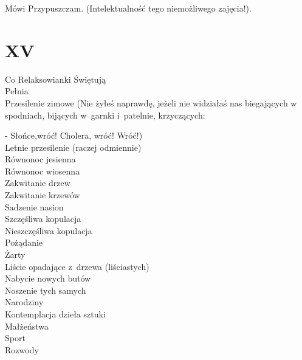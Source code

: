 \documentclass[oneside,polish,12pt,sfheadings]{mwbk}
\begin{document}
Mówi Przypuszczam. (Intelektualność tego niemożliwego zajęcia!).

\chapter{XV}

Co Relaksowianki Świętują\\


Pełnia\\


Przesilenie zimowe (Nie żyłeś naprawdę, jeżeli nie widziałaś nas biegających
w spodniach, bijących w~garnki i~patelnie, krzyczących: 

- Słońce,wróć! Cholera, wróć! Wróć!)\\

Letnie przesilenie (raczej odmiennie)\\

Równonoc jesienna\\

Równonoc wiosenna\\

Zakwitanie drzew\\

Zakwitanie krzewów\\

Sadzenie nasion\\

Szczęśliwa kopulacja\\

Nieszczęśliwa kopulacja\\

Pożądanie\\

Żarty\\

Liście opadające z~drzewa (liściastych)\\

Nabycie nowych butów\\

Noszenie tych samych\\

Narodziny\\

Kontemplacja dzieła sztuki\\

Małżeństwa\\

Sport\\

Rozwody\\
\end{document}
